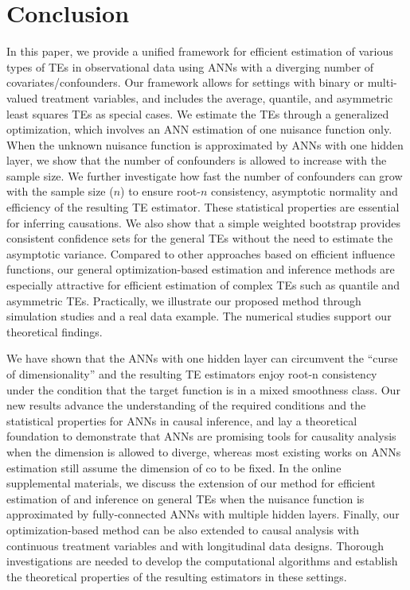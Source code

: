 \documentclass[11pt]{article}
\numberwithin{equation}{section}
\begin{document}
\section{Conclusion}\label{sec:conclusion}
In this paper, we provide a unified framework for
efficient estimation of various types of TEs in observational data using ANNs with a
diverging number of covariates/confounders. Our framework allows for settings
with binary or multi-valued treatment variables, and includes the
average, quantile, and asymmetric least squares TEs as special cases. We
estimate the TEs through a generalized optimization, which involves an ANN estimation of one nuisance function only. When the unknown nuisance function is approximated by ANNs
with one hidden layer, we show that the number of confounders is
allowed to increase with the sample size. We further investigate how fast
the number of confounders can grow with the sample size ($n$) to ensure root-$n$ consistency, asymptotic normality and efficiency of the
resulting TE estimator. These statistical properties
are essential for inferring causations. We also show that a simple weighted bootstrap provides consistent confidence sets for the general TEs without the need to estimate the asymptotic variance. Compared to other approaches based on efficient influence functions, our general optimization-based estimation and inference methods are especially attractive for efficient estimation of complex TEs such as quantile and asymmetric TEs.
Practically, we illustrate our proposed method through simulation studies and a real data example. The numerical studies support our theoretical findings.

We have shown that the ANNs with one hidden layer can circumvent the ``curse of dimensionality'' and the resulting TE estimators enjoy root-n consistency under the condition that the target function is in a mixed smoothness class. Our new results advance the understanding of the required conditions and the statistical properties for ANNs in causal inference, and lay a theoretical foundation to demonstrate that ANNs are promising tools for causality analysis when the dimension is allowed to diverge, whereas most existing works on ANNs estimation still assume the dimension of co to be fixed. In the online supplemental materials, we discuss the extension of our method for efficient estimation of and inference on general TEs when the nuisance function is approximated by fully-connected ANNs with multiple
hidden layers. Finally, our optimization-based method can be also extended to causal
analysis with continuous treatment variables and with longitudinal data
designs. Thorough investigations are needed to develop the computational
algorithms and establish the theoretical properties of the resulting
estimators in these settings.
\end{document}
